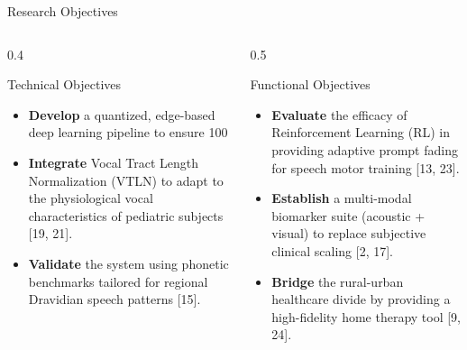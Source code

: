 \documentclass[aspectratio=169, 11pt]{beamer}
\begin{document}
\begin{frame}{Research Objectives}
\begin{columns}[T]
\begin{column}{0.4\textwidth}
\begin{block}{Technical Objectives}
\scriptsize
\begin{itemize}
\item \textbf{Develop} a quantized, edge-based deep learning pipeline to ensure 100%
\item \textbf{Integrate} Vocal Tract Length Normalization (VTLN) to adapt to the physiological vocal characteristics of pediatric subjects [19, 21].
\item \textbf{Validate} the system using phonetic benchmarks tailored for regional Dravidian speech patterns [15].
\end{itemize}
\end{block}
\end{column}
\begin{column}{0.5\textwidth}
\begin{block}{Functional Objectives}
\scriptsize
\begin{itemize}
\item \textbf{Evaluate} the efficacy of Reinforcement Learning (RL) in providing adaptive prompt fading for speech motor training [13, 23].
\item \textbf{Establish} a multi-modal biomarker suite (acoustic + visual) to replace subjective clinical scaling [2, 17].
\item \textbf{Bridge} the rural-urban healthcare divide by providing a high-fidelity home therapy tool [9, 24].
\end{itemize}
\end{block}
\end{column}
\end{columns}
\end{frame}
\end{document}
